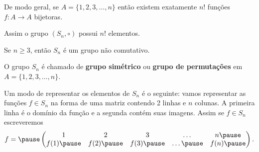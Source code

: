 \documentclass{beamer}
\begin{document}
    \begin{frame}
        De modo geral, \pause se $A = \{1, 2, 3, \dots, n\}$ \pause então existem exatamente $n!$ \pause funções $f : A \to A$ bijetoras. \pause

        \vspace{.3cm}

        Assim o grupo $(S_n, \circ)$ \pause possui $n!$ elementos.\pause

        \vspace{.3cm}

        Se $n \geqslant 3$, então \pause $S_n$ é um grupo não comutativo.\pause

        \begin{definicao}
            O grupo $S_n$ é chamado de \pause \textbf{grupo simétrico} \pause ou \textbf{grupo de permutações} \pause em $A = \{1, 2, 3, \dots, n\}$.
        \end{definicao}
    \end{frame}

    \begin{frame}
        Um modo de representar os elementos de $S_n$ é o seguinte: \pause vamos representar as funções $f \in S_n$ \pause na forma de uma matriz contendo 2 linhas \pause e $n$ colunas. \pause A primeira linha é o domínio da função \pause e a segunda contém suas imagens. \pause Assim se $f \in S_n$ escreveremos\pause
        \[
            f = \pause \begin{pmatrix}
                1 & 2 & 3 & \dots & n\pause \\
                f(1) \pause & f(2) \pause & f(3) \pause & \dots \pause & f(n)\pause
            \end{pmatrix}.
        \]
    \end{frame}
\end{document}
